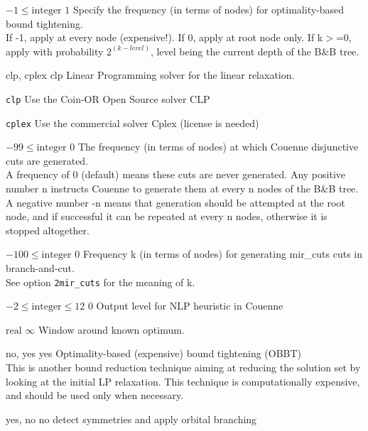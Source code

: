 %
{$-1\leq\textrm{integer}$}%
{$1$}%
{Specify the frequency (in terms of nodes) for optimality-based bound tightening.\\
If -1, apply at every node (expensive!). If 0, apply at root node only. If k$>$=0, apply with probability $2^{(k - level)}$, level being the current depth of the B\&B tree.}%
{}

%
{\ttfamily clp, cplex}%
{clp}%
{Linear Programming solver for the linear relaxation.}%
{\begin{list}{}{
\setlength{\parsep}{0em}
\setlength{\leftmargin}{5ex}
\setlength{\labelwidth}{2ex}
\setlength{\itemindent}{0ex}
\setlength{\topsep}{0pt}}
\item[\texttt{clp}] Use the Coin-OR Open Source solver CLP
\item[\texttt{cplex}] Use the commercial solver Cplex (license is needed)
\end{list}
}

%
{$-99\leq\textrm{integer}$}%
{$0$}%
{The frequency (in terms of nodes) at which Couenne disjunctive cuts are generated.\\
A frequency of 0 (default) means these cuts are never generated. Any positive number n instructs Couenne to generate them at every n nodes of the B\&B tree. A negative number -n means that generation should be attempted at the root node, and if successful it can be repeated at every n nodes, otherwise it is stopped altogether.}%
{}

%
{$-100\leq\textrm{integer}$}%
{$0$}%
{Frequency k (in terms of nodes) for generating mir\_cuts cuts in branch-and-cut.\\
See option \texttt{2mir\_cuts} for the meaning of k.}%
{}

%
{$-2\leq\textrm{integer}\leq12$}%
{$0$}%
{Output level for NLP heuristic in Couenne}%
{}

%
{$\textrm{real}$}%
{$\infty$}%
{Window around known optimum.}%
{}

%
{\ttfamily no, yes}%
{yes}%
{Optimality-based (expensive) bound tightening (OBBT)\\
This is another bound reduction technique aiming at reducing the solution set by looking at the initial LP relaxation. This technique is computationally expensive, and should be used only when necessary.}%
{}

%
{\ttfamily yes, no}%
{no}%
{detect symmetries and apply orbital branching}%
{}

